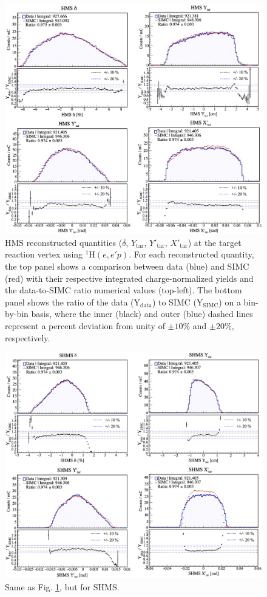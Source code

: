 \documentclass[aps, prl]{revtex4-2}  %
\begin{document}
\begin{figure}[h]
\includegraphics[scale=0.36]{plots/hms_acc_3288.png}
\caption{HMS reconstructed quantities ($\delta$,  $Y_{\mathrm{tar}}$, $Y'_{\mathrm{tar}}$, $X'_{\mathrm{tar}}$) at the target reaction vertex using $^{1}$H$(e,e'p)$.
  For each reconstructed quantity, the top panel shows a comparison between data (blue) and SIMC (red) with their respective integrated charge-normalized yields
  and the data-to-SIMC ratio numerical values (top-left). The bottom panel shows the ratio of the data (Y$_{\mathrm{data}}$) to SIMC (Y$_{\mathrm{SIMC}}$) on a bin-by-bin basis, where the inner (black)
and outer (blue) dashed lines represent a percent deviation from unity of $\pm10\%$ and $\pm20\%$, respectively.}
\label{fig:fig1}
\end{figure}
\clearpage
\begin{figure}[!ht]
\includegraphics[scale=0.36]{plots/shms_acc_3288.png}
\caption{Same as Fig. \ref{fig:fig1}, but for SHMS. }
\label{fig:fig2}
\end{figure}
\end{document}
